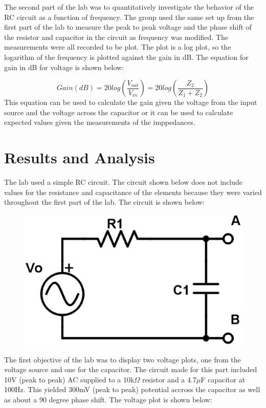 \documentclass[twocolumn, amsmath]{revtex4}
\begin{document}
The second part of the lab was to quantitatively investigate the behavior of the RC circuit as a function of frequency. The group used the same set up from the first part of the lab to measure the peak to peak voltage and the phase shift of the resistor and capacitor in the circuit as frequency was modified. The measurements were all recorded to be plot. The plot is a log plot, so the logarithm of the frequency is plotted against the gain in dB. The equation for gain in dB for voltage is shown below:

\begin{equation}
Gain (dB) = 20 log(\frac{V_{out}}{V_{in}}) = 20log(\frac{Z_2}{Z_1 + Z_2})
\end{equation}
This equation can be used to calculate the gain given the voltage from the input source and the voltage across the capacitor or it can be used to calculate expected values given the measurements of the imppedances.

\section{Results and Analysis}
The lab used a simple RC circuit. The circuit shown below does not include values for the resistance and capacitance of the elements because they were varied throughout the first part of the lab. The circuit is shown below:

\begin{figure}[h]  

\includegraphics[scale = 0.4]{schemeit-project.eps}  
\end{figure}

The first objective of the lab was to display two voltage plots, one from the voltage source and one for the capacitor. The circuit made for this part included 10V (peak to peak) AC supplied to a 10k$\Omega$ resistor and a 4.7$\mu$F capacitor at 100Hz. This  yielded 300mV (peak to peak) potential accross the capacitor as well as about a 90 degree phase shift. The voltage plot is shown below:
\end{document}
